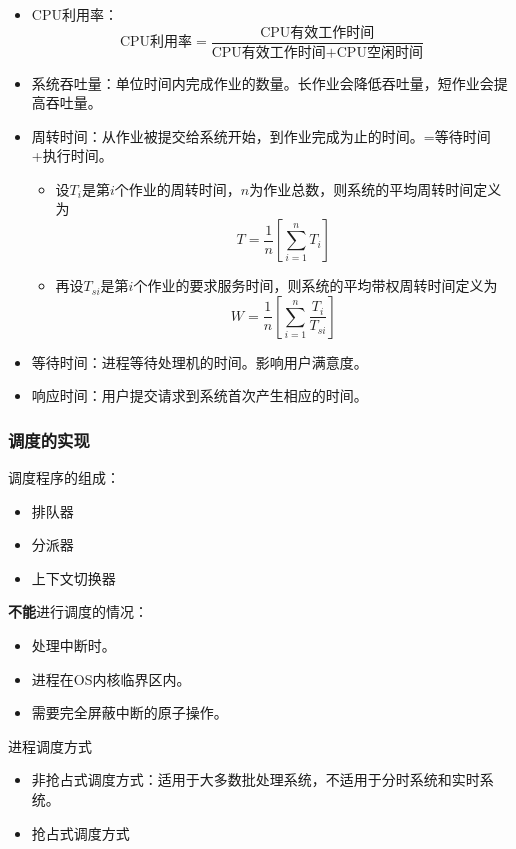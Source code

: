 \documentclass[12pt, a4paper, oneside]{ctexart}
\begin{document}
\begin{itemize}
  \item CPU利用率：
  \begin{equation*}
    \text{CPU利用率}=\frac{\text{CPU有效工作时间}}{\text{CPU有效工作时间+CPU空闲时间}}
  \end{equation*}
  \item 系统吞吐量：单位时间内完成作业的数量。长作业会降低吞吐量，短作业会提高吞吐量。
  \item 周转时间：从作业被提交给系统开始，到作业完成为止的时间。=等待时间+执行时间。
  \begin{itemize}
    \item 设$T_i$是第$i$个作业的周转时间，$n$为作业总数，则系统的平均周转时间定义为
    \begin{equation*}
        T=\frac{1}{n}\left[\sum_{i=1}^{n}T_i\right]
    \end{equation*}  
    \item 再设$T_{si}$是第$i$个作业的要求服务时间，则系统的平均带权周转时间定义为
    \begin{equation*}
        W=\frac{1}{n}\left[\sum_{i=1}^{n}\frac{T_i}{T_{si}}\right]
    \end{equation*}
  \end{itemize}
  \item 等待时间：进程等待处理机的时间。影响用户满意度。
  \item 响应时间：用户提交请求到系统首次产生相应的时间。
\end{itemize}

\subsubsection{调度的实现}

调度程序的组成：
\begin{itemize}
  \item 排队器
  \item 分派器
  \item 上下文切换器
\end{itemize}

\textbf{不能}进行调度的情况：
\begin{itemize}
  \item 处理中断时。
  \item 进程在OS内核临界区内。
  \item 需要完全屏蔽中断的原子操作。
\end{itemize}

进程调度方式
\begin{itemize}
  \item 非抢占式调度方式：适用于大多数批处理系统，不适用于分时系统和实时系统。
  \item 抢占式调度方式
\end{itemize}
\end{document}
